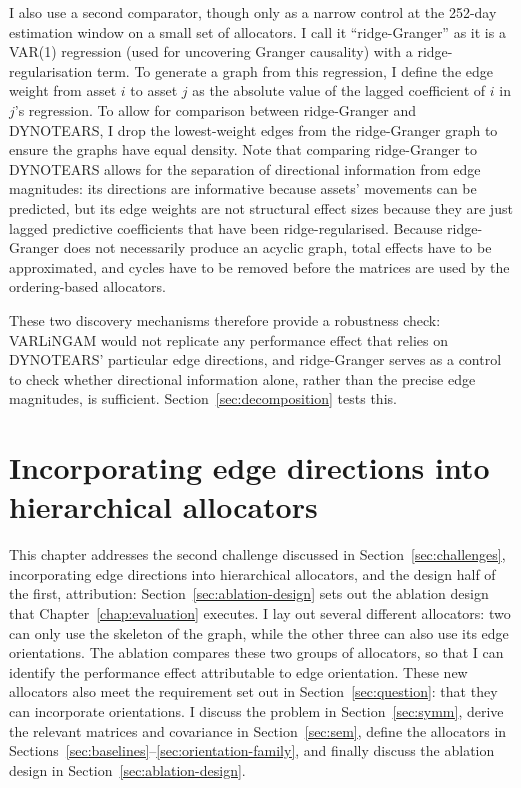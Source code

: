 \documentclass[11pt, a4paper]{report}
\begin{document}
I also use a second comparator, though only as a narrow control at the 252-day estimation window on a small set of allocators. I call it ``ridge-Granger'' as it is a VAR(1) regression (used for uncovering Granger causality) with a ridge-regularisation term. 
To generate a graph from this regression, I define the edge weight from asset $i$ to asset $j$ as the absolute value of the lagged coefficient of $i$ in $j$'s regression. To allow for comparison between ridge-Granger and DYNOTEARS, I drop the lowest-weight edges from the ridge-Granger graph to ensure the graphs have equal density.
Note that comparing ridge-Granger to DYNOTEARS allows for the separation of directional information from edge magnitudes: its directions are informative because assets' movements can be predicted, but its edge weights are not structural effect sizes because they are just lagged predictive coefficients that have been ridge-regularised.
Because ridge-Granger does not necessarily produce an acyclic graph, total effects have to be approximated, and cycles have to be removed before the matrices are used by the ordering-based allocators.

These two discovery mechanisms therefore provide a robustness check: 
VARLiNGAM would not replicate any performance effect that relies on DYNOTEARS' particular edge directions, and ridge-Granger serves as a control to check whether directional information alone, rather than the precise edge magnitudes, is sufficient.
Section~\ref{sec:decomposition} tests this.

\chapter{Incorporating edge directions into hierarchical allocators}
\label{chap:allocators}

This chapter addresses the second challenge discussed in Section~\ref{sec:challenges}, incorporating edge directions into hierarchical allocators, and the design half of the first, attribution: Section~\ref{sec:ablation-design} sets out the ablation design that Chapter~\ref{chap:evaluation} executes.
I lay out several different allocators: two can only use the skeleton of the
graph, while the other three can also use its edge orientations.
The ablation compares these two groups of allocators, so that I can identify the performance effect attributable to edge orientation.
These new allocators also meet the requirement set out in
Section~\ref{sec:question}: that they can incorporate orientations. I discuss the problem in Section~\ref{sec:symm}, derive the relevant matrices and covariance in Section~\ref{sec:sem}, define the allocators in Sections~\ref{sec:baselines}--\ref{sec:orientation-family}, and finally discuss the ablation design in Section~\ref{sec:ablation-design}.
\end{document}

